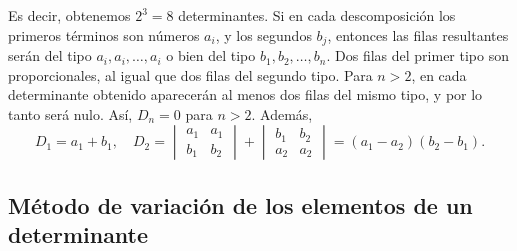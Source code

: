 \begin{examplebox}{}{}
\begin{matrizn}
    \end{matrizn}
    Es decir, obtenemos $2^3 = 8$ determinantes. Si en cada descomposición los primeros términos son números $a_i$, y los segundos $b_j$, entonces las filas resultantes serán del tipo $a_i, a_i, \dots, a_i$ o bien del tipo $b_1, b_2, \dots, b_n$. Dos filas del primer tipo son proporcionales, al igual que dos filas del segundo tipo. Para $n > 2$, en cada determinante obtenido aparecerán al menos dos filas del mismo tipo, y por lo tanto será nulo. Así, $D_n = 0$ para $n > 2$. Además,
    $$D_1 = a_1 + b_1, \quad D_2 = \begin{vmatrix}
        a_1 & a_1 \\
        b_1 & b_2
    \end{vmatrix} + \begin{vmatrix}
        b_1 & b_2 \\
        a_2 & a_2
    \end{vmatrix} = (a_1 - a_2)(b_2 - b_1).$$
\end{examplebox}

\newpage

\subsection*{Método de variación de los elementos de un determinante}

